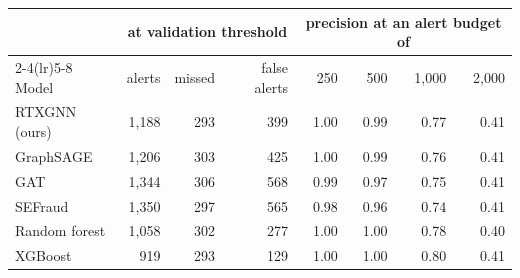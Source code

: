 \begin{tabular}{lrrrrrrr}
\toprule
 & \multicolumn{3}{c}{at validation threshold} & \multicolumn{4}{c}{precision at an alert budget of}\\
\cmidrule(lr){2-4}\cmidrule(lr){5-8}
Model & alerts & missed & false alerts & 250 & 500 & 1,000 & 2,000\\
\midrule
RTXGNN (ours) & 1,188 & 293 & 399 & 1.00 & 0.99 & 0.77 & 0.41\\
GraphSAGE & 1,206 & 303 & 425 & 1.00 & 0.99 & 0.76 & 0.41\\
GAT & 1,344 & 306 & 568 & 0.99 & 0.97 & 0.75 & 0.41\\
SEFraud & 1,350 & 297 & 565 & 0.98 & 0.96 & 0.74 & 0.41\\
Random forest & 1,058 & 302 & 277 & 1.00 & 1.00 & 0.78 & 0.40\\
XGBoost & 919 & 293 & 129 & 1.00 & 1.00 & 0.80 & 0.41\\
\bottomrule
\end{tabular}
